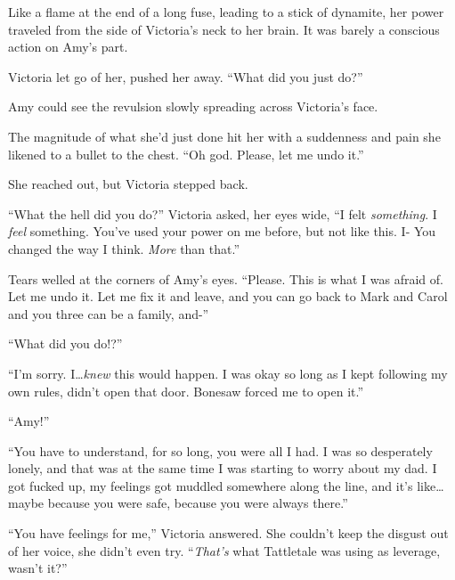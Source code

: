 Like a flame at the end of a long fuse, leading to a stick of dynamite, her power traveled from the side of Victoria's neck to her brain.  It was barely a conscious action on Amy's part.



Victoria let go of her, pushed her away.  ``What did you just do?''



Amy could see the revulsion slowly spreading across Victoria's face.



The magnitude of what she'd just done hit her with a suddenness and pain she likened to a bullet to the chest.  ``Oh god.  Please, let me undo it.''



She reached out, but Victoria stepped back.



``What the hell did you do?'' Victoria asked, her eyes wide, ``I felt \emph{something}.  I \emph{feel} something.  You've used your power on me before, but not like this.  I- You changed the way I think.  \emph{More} than that.''



Tears welled at the corners of Amy's eyes.  ``Please.  This is what I was afraid of.  Let me undo it.  Let me fix it and leave, and you can go back to Mark and Carol and you three can be a family, and-''



``What did you do!?''



``I'm sorry.  I\ldots \emph{knew} this would happen.  I was okay so long as I kept following my own rules, didn't open that door.  Bonesaw forced me to open it.''



``Amy!''



``You have to understand, for so long, you were all I had.  I was so desperately lonely, and that was at the same time I was starting to worry about my dad.  I got fucked up, my feelings got muddled somewhere along the line, and it's like\ldots maybe because you were safe, because you were always there.''



``You have feelings for me,'' Victoria answered.  She couldn't keep the disgust out of her voice, she didn't even try.  ``\emph{That's} what Tattletale was using as leverage, wasn't it?''



